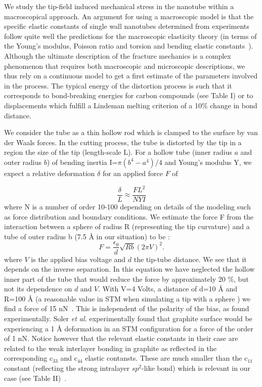 \begin{multicols}{2}
We study the tip-field induced mechanical stress in the nanotube
within a macroscopical approach. An argument for using a
macroscopic model is that the specific elastic constants of single
wall nanotubes determined from experiments follow quite well the
predictions for the macroscopic elasticity theory (in terms of the
Young's modulus, Poisson ratio and torsion and bending elastic
constants~\cite{Hernandez}). Although the ultimate description of
the fracture mechanics is a complex phenomenon that requires both
macroscopic and microscopic descriptions, we thus rely on a
continuous model to get a first estimate of the parameters
involved in the process. The typical energy of the distortion
process is such that it corresponds to bond-breaking energies for
carbon compounds (see Table I) or to displacements which fulfill a
Lindeman melting criterion \cite{Lindemann} of a 10\% change in
bond distance.

We consider the tube as a thin hollow rod which is clamped to the
surface by van der Waals forces. In the cutting process, the tube
is distorted by the tip in a region the size of the tip
(length-scale L). For a hollow tube (inner radius $a$ and outer
radius $b$) of bending inertia I=$\pi (b^{4}-a^{4})/4$ and Young's
modulus Y, we expect a relative deformation $\delta$ for an
applied force $F$ of \cite{LL}

\begin{equation}
\frac{\delta }{L}\approx \frac{FL^{2}}{NYI} \end{equation}
where N is a number of order 10-100 depending on details of the
modeling such as force distribution and boundary conditions. We
estimate the force F from the interaction between a sphere of
radius R (representing the tip curvature) and a tube of outer
radius b (7.5 {\AA } in our situation) to be \cite{DJ}:
\begin{equation}
F=\frac{\epsilon _{0}}{d}\sqrt{Rb}(2\pi V)^{2}. \end{equation}
where $V$ is the applied bias voltage and $d$ the tip-tube
distance. We see that it depends on the inverse separation. In
this equation we have neglected the hollow inner part of the tube
that would reduce the force by approximately 20 \%, but not its
dependence on $d$ and $V$. With V=4 Volts, a distance of d=10
{\AA } and R=100 {\AA } (a reasonable value in STM when
simulating a tip with a sphere \cite{Johansson}) we find a force
of 15 nN~\cite{linear}. This is independent of the polarity of the
bias, as found experimentally. Soler {\it et al.} \cite{soler}
experimentally found that graphite surface would be experiencing a
1 {\AA } deformation in an STM configuration for a force of the
order of 1 nN. Notice however that the relevant elastic constants
in their case are related to the weak interlayer bonding in
graphite as reflected in the corresponding c$_{33}$ and c$_{44}$
elastic contansts. These are much smaller than the c$_{11}$
constant (reflecting the strong intralayer $sp^2$-like bond) which
is relevant in our case (see Table II)~\cite{shear}.


\end{multicols}
